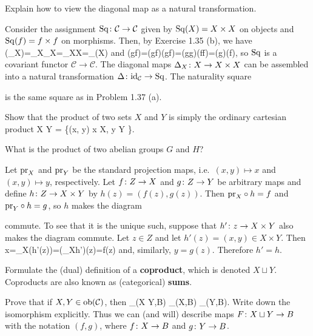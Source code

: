 \bx
Explain how to view the diagonal map as a natural transformation.
\ex

\bs
Consider the assignment $\mathrm{Sq}\colon \mathcal{C}\to \mathcal{C}$ given by $\mathrm{Sq}(X)=X\times X$ on objects and $\mathrm{Sq}(f)=f\times f$ on morphisms. Then, by Exercise 1.35 (b), we have
\bse
\Sq(\id_X)=\id_X\times \id_X=\id_{X\times X}=\id_{\Sq(X)}
\ese
and
\bse
\Sq(g\circ f)=(g\circ f)\times (g\circ f)=(g\times g)\circ (f\times f)=\Sq(g)\circ \Sq(f),
\ese
so $\mathrm{Sq}$ is a covariant functor $\mathcal{C}\to\mathcal{C}$. The diagonal maps $\Delta_X\colon X\to X\times X$ can be assembled into a natural transformation $\Delta\colon \mathrm{id}_{\mathcal{C}}\to \mathrm{Sq}$. The naturality square
\bse
{}
\ese
is the same square as in Problem 1.37 (a).
\es

\bx
\ben[label=(\alph*)]
\item Show that the product of two sets $X$ and $Y$ is simply the ordinary cartesian product
\bse
X \times Y = \{(x, y) \mid x \in X, y \in Y \}.
\ese
\item What is the product of two abelian groups $G$ and $H$?
\een
\ex

\bs
\ben[label=(\alph*)]
\item Let $\mathrm{pr}_X$ and $\mathrm{pr}_Y$ be the standard projection maps, i.e.\ $(x,y)\mapsto x$ and $(x,y)\mapsto y$, respectively. Let $f\colon Z\to X$ and $g\colon Z\to Y$ be arbitrary maps and define $h\colon Z\to X\times Y$ by $h(z)=(f(z),g(z))$. Then $\mathrm{pr}_X\circ h=f$ and $\mathrm{pr}_Y\circ h=g$, so $h$ makes the diagram
\bse
{}
\ese
commute. To see that it is the unique such, suppose that $h'\colon z\to X\times Y$ also makes the diagram commute. Let $z\in Z$ and let $h'(z)=(x,y)\in X\times Y$. Then
\bse
x=\pr_X(h'(z))=(\pr_X\circ h')(z)=f(z)
\ese
and, similarly, $y=g(z)$. Therefore $h'=h$.
\item
\een
\es

\bp
\ben[label=(\alph*)]
\item Formulate the (dual) definition of a \textbf{coproduct}, which is denoted $X\sqcup Y$. Coproducts are also known as (categorical) \textbf{sums}.
\item Prove that if $X, Y \in \operatorname{ob}(\mathcal{C})$, then
\bse
\mor_{}(X \sqcup Y,B) \cong \mor_{}(X,B) \times \mor_{}(Y,B).
\ese
Write down the isomorphism explicitly. Thus we can (and will) describe maps $F \colon X\sqcup Y \to B$ with the notation $(f, g)$, where $f \colon X \to B$ and $g \colon Y \to B$.

